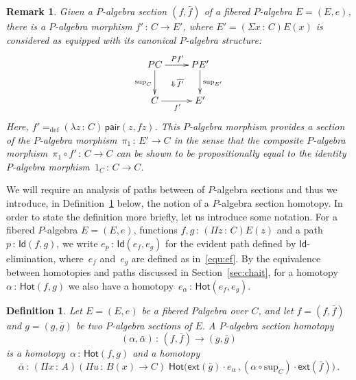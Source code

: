 \documentclass[10pt,a4paper,oneside,reqno]{amsart}
\numberwithin{equation}{section}
\theoremstyle{mythm}
\theoremstyle{mydef}
\newtheorem{definition}[theorem]{Definition}
\theoremstyle{myrmk}
\newtheorem*{remark*}{Remark}
\newcommand{\defeq}{=_{\mathrm{def}}}
\newcommand{\co}{\,{:}\,}
\newcommand{\ct}{\cdot}
\newcommand{\Hot}{\mathsf{Hot}}
\newcommand{\ext}{\mathsf{ext}}
\newcommand{\Id}{\mathsf{Id}}
\newcommand{\pair}{\mathsf{pair}}
\renewcommand{\sup}{\mathrm{sup}}
\begin{document}
\begin{remark*}
Given a $P$-algebra section $(f, \bar{f})$ of a fibered $P$-algebra $E = (E, e)$, there is a $P$-algebra 
morphism $f' \co C \to E'$, where $E' = (\Sigma x \co C) E(x)$ is considered as equipped with its canonical 
$P$-algebra structure: 
\[
\xymatrix{
PC \ar[r]^{Pf'} \ar[d]_{\sup_C} \ar@{}[dr]|{\Downarrow \, \overline{f'}} & PE' \ar[d]^{\sup_{E'}} \\
C \ar[r]_{f'} & E'}
\]
Here, $f' \defeq (\lambda z \co C) \, \pair(z, fz)$. This $P$-algebra morphism provides
a section of the $P$-algebra morphism~$\pi_1 \co E' \to C$ in the sense that the composite $P$-algebra
morphism~$\pi_1 \circ f' \co C \to C$ can be shown to be propositionally equal to the identity $P$-algebra
morphism~$1_C \co C \to C$. 
\end{remark*}

\medskip


We will require an analysis of paths between of $P$-algebra sections and thus we introduce, in Definition~\ref{def:W2cellsection} below, the
notion of a $P$-algebra section homotopy. In order to state the definition more briefly, let us introduce some
notation. For a fibered $P$-algebra $E = (E,e)$, functions $f, g \co (\Pi z \co C) E(z)$ and a path $p \co
\Id(f,g)$, we write $e_p \co \Id(e_f, e_g)$ for the evident path defined by $\Id$-elimination, 
where~$e_f$ and~$e_g$ are defined as in~\eqref{equ:ef}. By the equivalence between homotopies
and paths discussed in Section~\ref{sec:chait}, for a homotopy $\alpha \co \Hot(f,g)$ we also have
a homotopy~$e_\alpha \co \Hot(e_f, e_g)$. 

\begin{definition} \label{def:W2cellsection} Let $E = (E, e)$ be a fibered $P$algebra over $C$, and let $f = (f, \bar{f})$ and $g = (g, \bar{g})$ be two $P$-algebra sections of $E$.  A \emph{$P$-algebra section homotopy} 
\[
(\alpha , \bar{\alpha}) \co (f, \bar{f})  \rightarrow (g, \bar{g})
\] 
is a homotopy~$\alpha \co \Hot(f, g)$ and a homotopy
\[
\bar{\alpha} \co 
(\Pi x \co A) (\Pi u \co B(x) \to C) \;
\Hot\big( \ext( \bar{g})  \ct e_\alpha \, , 
(\alpha \circ \sup_C) \ct \ext( \bar{f}) \big) \, .
\]
\end{definition} 
\end{document}
